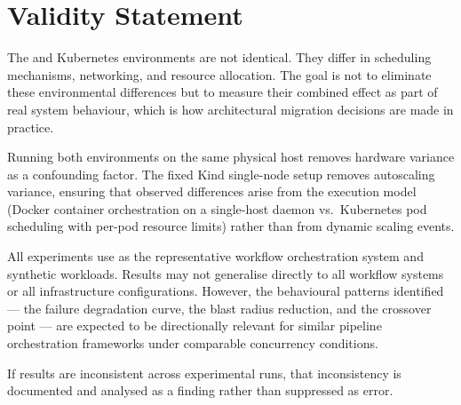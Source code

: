 \section{Validity Statement}

The \vm{} and Kubernetes environments are not identical. They differ in scheduling
mechanisms, networking, and resource allocation. The goal is not to eliminate these
environmental differences but to measure their combined effect as part of real system
behaviour, which is how architectural migration decisions are made in practice.

Running both environments on the same physical host removes hardware variance as a
confounding factor. The fixed Kind single-node setup removes autoscaling variance, ensuring
that observed differences arise from the execution model (Docker container orchestration on
a single-host daemon vs.\ Kubernetes pod scheduling with per-pod resource limits) rather
than from dynamic scaling events.

All experiments use \dagster{} as the representative workflow orchestration system and
synthetic workloads. Results may not generalise directly to all workflow systems or all
infrastructure configurations. However, the behavioural patterns identified --- the failure
degradation curve, the blast radius reduction, and the crossover point --- are expected to
be directionally relevant for similar pipeline orchestration frameworks under comparable
concurrency conditions.

If results are inconsistent across experimental runs, that inconsistency is documented and
analysed as a finding rather than suppressed as error.
